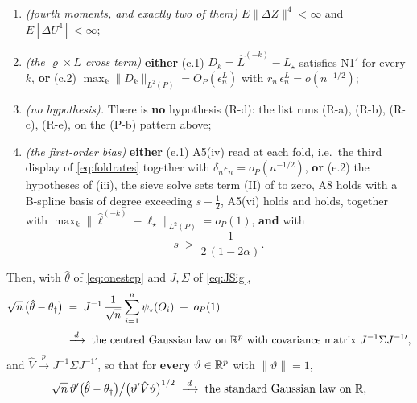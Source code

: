 \begin{theorem}
\begin{enumerate}
\item[(R-b)] \emph{(fourth moments, and exactly two of them)} $E\|\Delta Z\|^{4}<\infty$ and
$E[\Delta U^{4}]<\infty$;
\item[(R-c)] \emph{(the $\varrho\times L$ cross term)} \textbf{either} \textup{(c.1)} $D_k=\hat L^{(-k)}-L_\star$
satisfies N1$'$ for every $k$, \textbf{or} \textup{(c.2)}
$\max_k\|D_k\|_{L^{2}(P)}=O_P(\epsilon^{L}_n)$ with $r_n\,\epsilon^{L}_n=o(n^{-1/2})$;
\item[(R-d)] \emph{(no hypothesis).} There is \textbf{no} hypothesis (R-d): the list runs (R-a), (R-b),
(R-c), (R-e), on the \textup{(P-b)} pattern above;
\item[(R-e)] \emph{(the first-order bias)} \textbf{either} \textup{(e.1)} A5(iv) read at each fold, i.e.\ the
third display of \eqref{eq:foldrates} together with $\delta_n\epsilon_n=o_P(n^{-1/2})$, \textbf{or}
\textup{(e.2)} the hypotheses of \textup{(iii)}, the sieve solve sets term
\textup{(II)} of  to zero, A8 holds with a B-spline basis of degree exceeding
$s-\tfrac12$, A5(vi) holds and  holds, together with
$\max_k\|\hat\ell^{(-k)}-\ell_\star\|_{L^{2}(P)}=o_P(1)$, \textbf{and} with
\begin{equation}\label{eq:re2window}
s\;>\;\frac{1}{2\,(1-2\alpha)} .
\end{equation}
\end{enumerate}
Then, with $\hat\theta$ of \eqref{eq:onestep} and $J,\Sigma$ of \eqref{eq:JSig},
\begin{equation}\label{eq:rootn}
\begin{split}
\sqrt n\,\big(\hat\theta-\theta_\dagger\big)
&\;=\;J^{-1}\,\frac1{\sqrt n}\sum_{i=1}^{n}\psi_\star(O_i)\;+\;o_P(1)\\[2pt]
&\;\xrightarrow{\;d\;}\;\text{the centred Gaussian law on }\mathbb{R}^{p}\text{ with covariance matrix }
J^{-1}\Sigma J^{-1\prime} ,
\end{split}
\end{equation}
and $\hat V\xrightarrow{p}J^{-1}\Sigma J^{-1\prime}$, so that for \textbf{every} $\vartheta\in\mathbb{R}^{p}$ with
$\|\vartheta\|=1$,
\[
\sqrt n\,\vartheta'\big(\hat\theta-\theta_\dagger\big)\big/\big(\vartheta'\hat V\vartheta\big)^{1/2}
\;\xrightarrow{\;d\;}\;\text{the standard Gaussian law on }\mathbb{R} ,
\]
\end{theorem}
